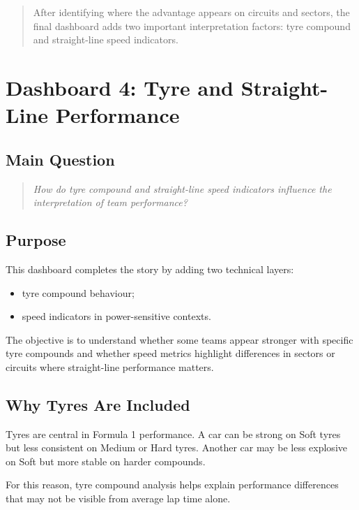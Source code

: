 \documentclass[12pt,a4paper]{article}
\begin{document}
	\begin{quote}
		After identifying where the advantage appears on circuits and sectors, the final dashboard adds two important interpretation factors: tyre compound and straight-line speed indicators.
	\end{quote}
	
	\section{Dashboard 4: Tyre and Straight-Line Performance}
	
	\subsection{Main Question}
	
	\begin{quote}
		\textit{How do tyre compound and straight-line speed indicators influence the interpretation of team performance?}
	\end{quote}
	
	\subsection{Purpose}
	
	This dashboard completes the story by adding two technical layers:
	
	\begin{itemize}[leftmargin=1.2cm]
		\item tyre compound behaviour;
		\item speed indicators in power-sensitive contexts.
	\end{itemize}
	
	The objective is to understand whether some teams appear stronger with specific tyre compounds and whether speed metrics highlight differences in sectors or circuits where straight-line performance matters.
	
	\subsection{Why Tyres Are Included}
	
	Tyres are central in Formula 1 performance.
	A car can be strong on Soft tyres but less consistent on Medium or Hard tyres.
	Another car may be less explosive on Soft but more stable on harder compounds.
	
	For this reason, tyre compound analysis helps explain performance differences that may not be visible from average lap time alone.
	
\end{document}
